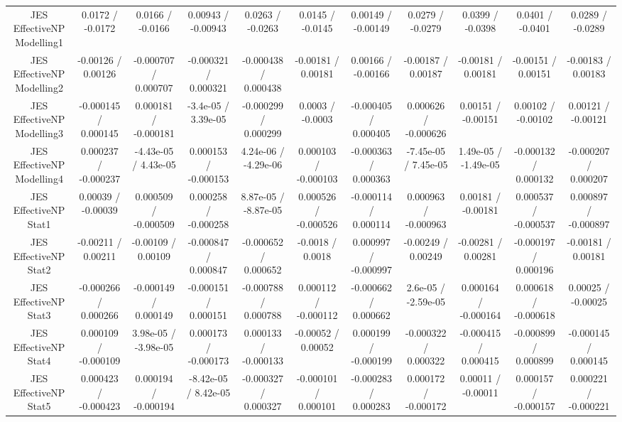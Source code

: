 \begin{table}[htbp]
\begin{center}
\begin{tabular}{|c|c|c|c|c|c|c|c|c|c|c|}
  JES EffectiveNP Modelling1 & 0.0172 / -0.0172 & 0.0166 / -0.0166 & 0.00943 / -0.00943 & 0.0263 / -0.0263 & 0.0145 / -0.0145 & 0.00149 / -0.00149 & 0.0279 / -0.0279 & 0.0399 / -0.0398 & 0.0401 / -0.0401 & 0.0289 / -0.0289 \\ 
  JES EffectiveNP Modelling2 & -0.00126 / 0.00126 & -0.000707 / 0.000707 & -0.000321 / 0.000321 & -0.000438 / 0.000438 & -0.00181 / 0.00181 & 0.00166 / -0.00166 & -0.00187 / 0.00187 & -0.00181 / 0.00181 & -0.00151 / 0.00151 & -0.00183 / 0.00183 \\ 
  JES EffectiveNP Modelling3 & -0.000145 / 0.000145 & 0.000181 / -0.000181 & -3.4e-05 / 3.39e-05 & -0.000299 / 0.000299 & 0.0003 / -0.0003 & -0.000405 / 0.000405 & 0.000626 / -0.000626 & 0.00151 / -0.00151 & 0.00102 / -0.00102 & 0.00121 / -0.00121 \\ 
  JES EffectiveNP Modelling4 & 0.000237 / -0.000237 & -4.43e-05 / 4.43e-05 & 0.000153 / -0.000153 & 4.24e-06 / -4.29e-06 & 0.000103 / -0.000103 & -0.000363 / 0.000363 & -7.45e-05 / 7.45e-05 & 1.49e-05 / -1.49e-05 & -0.000132 / 0.000132 & -0.000207 / 0.000207 \\ 
  JES EffectiveNP Stat1 & 0.00039 / -0.00039 & 0.000509 / -0.000509 & 0.000258 / -0.000258 & 8.87e-05 / -8.87e-05 & 0.000526 / -0.000526 & -0.000114 / 0.000114 & 0.000963 / -0.000963 & 0.00181 / -0.00181 & 0.000537 / -0.000537 & 0.000897 / -0.000897 \\ 
  JES EffectiveNP Stat2 & -0.00211 / 0.00211 & -0.00109 / 0.00109 & -0.000847 / 0.000847 & -0.000652 / 0.000652 & -0.0018 / 0.0018 & 0.000997 / -0.000997 & -0.00249 / 0.00249 & -0.00281 / 0.00281 & -0.000197 / 0.000196 & -0.00181 / 0.00181 \\ 
  JES EffectiveNP Stat3 & -0.000266 / 0.000266 & -0.000149 / 0.000149 & -0.000151 / 0.000151 & -0.000788 / 0.000788 & 0.000112 / -0.000112 & -0.000662 / 0.000662 & 2.6e-05 / -2.59e-05 & 0.000164 / -0.000164 & 0.000618 / -0.000618 & 0.00025 / -0.00025 \\ 
  JES EffectiveNP Stat4 & 0.000109 / -0.000109 & 3.98e-05 / -3.98e-05 & 0.000173 / -0.000173 & 0.000133 / -0.000133 & -0.00052 / 0.00052 & 0.000199 / -0.000199 & -0.000322 / 0.000322 & -0.000415 / 0.000415 & -0.000899 / 0.000899 & -0.000145 / 0.000145 \\ 
  JES EffectiveNP Stat5 & 0.000423 / -0.000423 & 0.000194 / -0.000194 & -8.42e-05 / 8.42e-05 & -0.000327 / 0.000327 & -0.000101 / 0.000101 & -0.000283 / 0.000283 & 0.000172 / -0.000172 & 0.00011 / -0.00011 & 0.000157 / -0.000157 & 0.000221 / -0.000221 \\ 

\end{tabular}
\end{center}
\end{table}
